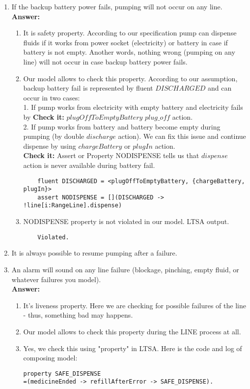 \documentclass{article}
\begin{document}
\begin{enumerate}
     
      
    
    \item If the backup battery power fails, pumping will not occur on any line.\\
    \textbf{Answer:}
    \begin{enumerate}
    \item It is safety property. According to our specification pump can dispense fluids if it works from power
    socket (electricity) or battery in case if battery is not empty. Another words, nothing wrong (pumping on any line) will
    not occur in case backup battery power fails.
 
    \item Our model allows to check this property. According to our assumption, backup battery fail is represented by fluent
    $DISCHARGED$ and can occur in two cases:\\
    1. If pump works from electricity with empty battery and electricity fails by \textbf{Check it:} $plugOffToEmptyBattery$
    $plug\_off$ action.\\
    2. If pump works from battery and battery become empty during pumping (by double $discharge$ action).
    We can fix this issue and continue dispense by using $chargeBattery$ or $plugIn$ action.\\
    \textbf{Check it:} Assert or Property NODISPENSE tells us that $dispense$ action is never available during battery fail.
    \begin{verbatim}
    fluent DISCHARGED = <plugOffToEmptyBattery, {chargeBattery, plugIn}>
    assert NODISPENSE = [](DISCHARGED -> !line[i:RangeLine].dispense)
    \end{verbatim}
    
    \item NODISPENSE property is not violated in our model. LTSA output.
    \begin{verbatim}
    Violated.
    \end{verbatim} 
    \end{enumerate}    
    
    
    \item It is always possible to resume pumping after a failure.
    \item An alarm will sound on any line failure (blockage, pinching, empty fluid, or
whatever failures you model).\\
    \textbf{Answer:}
    \begin{enumerate}
    	\item It's liveness property. Here we are checking for possible failures of the line - thus, something bad may happens.
		\item Our model allows to check this property during the LINE process at all.
		\item Yes, we check this using "property" in LTSA. Here is the code and log of composing model:
\begin{verbatim}
property SAFE_DISPENSE
=(medicineEnded -> refillAfterError -> SAFE_DISPENSE).


\end{verbatim}
\end{enumerate}
\end{enumerate}
\end{document}
